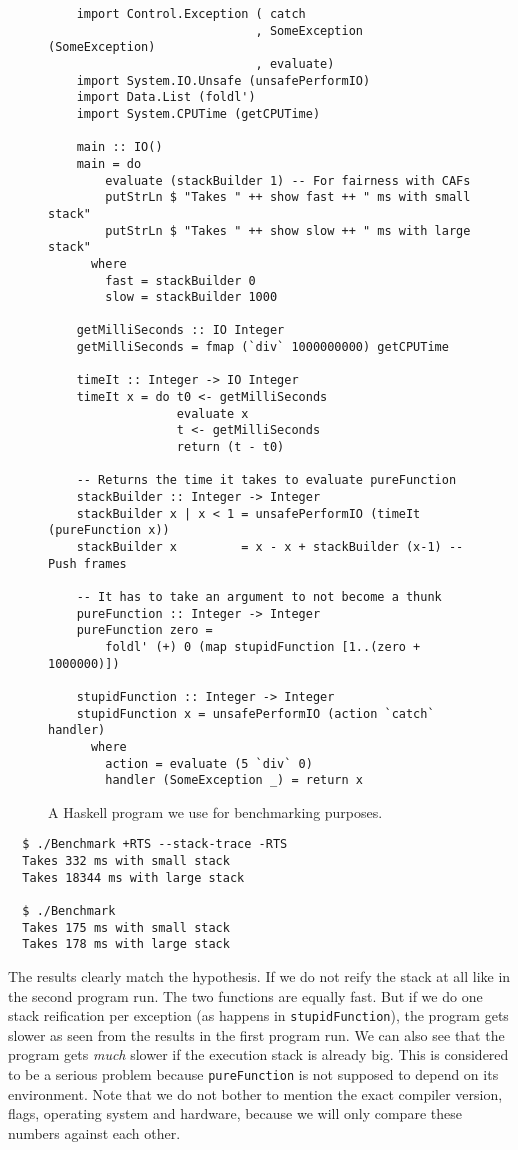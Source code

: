 \begin{figure}
\begin{mdframed}
  \begin{verbatim}
    import Control.Exception ( catch
                             , SomeException (SomeException)
                             , evaluate)
    import System.IO.Unsafe (unsafePerformIO)
    import Data.List (foldl')
    import System.CPUTime (getCPUTime)

    main :: IO()
    main = do
        evaluate (stackBuilder 1) -- For fairness with CAFs
        putStrLn $ "Takes " ++ show fast ++ " ms with small stack"
        putStrLn $ "Takes " ++ show slow ++ " ms with large stack"
      where
        fast = stackBuilder 0
        slow = stackBuilder 1000

    getMilliSeconds :: IO Integer
    getMilliSeconds = fmap (`div` 1000000000) getCPUTime

    timeIt :: Integer -> IO Integer
    timeIt x = do t0 <- getMilliSeconds
                  evaluate x
                  t <- getMilliSeconds
                  return (t - t0)

    -- Returns the time it takes to evaluate pureFunction
    stackBuilder :: Integer -> Integer
    stackBuilder x | x < 1 = unsafePerformIO (timeIt (pureFunction x))
    stackBuilder x         = x - x + stackBuilder (x-1) -- Push frames

    -- It has to take an argument to not become a thunk
    pureFunction :: Integer -> Integer
    pureFunction zero =
        foldl' (+) 0 (map stupidFunction [1..(zero + 1000000)])

    stupidFunction :: Integer -> Integer
    stupidFunction x = unsafePerformIO (action `catch` handler)
      where
        action = evaluate (5 `div` 0)
        handler (SomeException _) = return x
  \end{verbatim}
  \caption{A Haskell program we use for benchmarking purposes.}
  \label{fig:benchmark_program}
\end{mdframed}
\end{figure}

\begin{verbatim}
  $ ./Benchmark +RTS --stack-trace -RTS
  Takes 332 ms with small stack
  Takes 18344 ms with large stack

  $ ./Benchmark
  Takes 175 ms with small stack
  Takes 178 ms with large stack
\end{verbatim}

The results clearly match the hypothesis. If we do not reify the stack
at all like in the second program run. The two functions are equally
fast. But if we do one stack reification per exception (as happens in
\texttt{stupidFunction}), the program gets slower as seen from the
results in the first program run. We can also see that the program
gets \emph{much} slower if the execution stack is already big. This
is considered to be a serious problem because \texttt{pureFunction}
is not supposed to depend on its environment. Note that we do not
bother to mention the exact compiler version, flags, operating system and
hardware, because we will only compare these numbers against each other.

